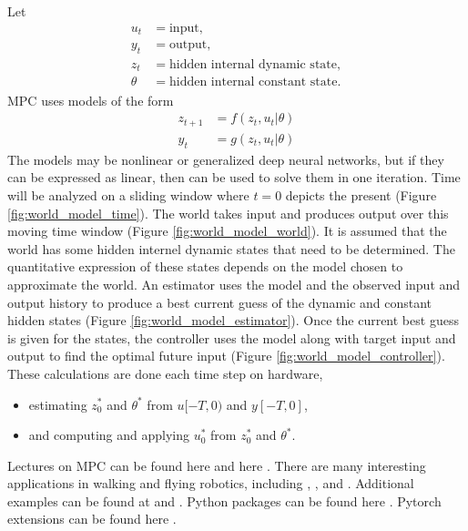 \documentclass{article}
\begin{document}
    Let
    \begin{align*}
        u_t&=\text{input},\\
        y_t&=\text{output},\\
        z_t&=\text{hidden internal dynamic state},\\
        \theta_{\phantom{t}}&=\text{hidden internal constant state}.
    \end{align*}
    MPC uses models of the form 
    \begin{align*}
        z_{t+1}&=f(z_t,u_t|\theta)\\
        y_t &= g(z_t,u_t|\theta)
    \end{align*}
    The models may be nonlinear or generalized deep neural networks, but if they can
    be expressed as linear, then \QP can be used to solve them in one iteration.
    Time will be analyzed on a sliding window where $t=0$ depicts the present 
    (Figure \ref{fig:world_model_time}).
    The world takes input and produces output over this moving time window
    (Figure \ref{fig:world_model_world}).
    It is assumed that the world has some hidden internel dynamic states
    that need to be determined.  
    The quantitative expression of these states depends on the model
    chosen to approximate the world.  An estimator uses the model and the observed
    input and output history to produce a best current guess of the dynamic and constant
    hidden states (Figure \ref{fig:world_model_estimator}).
    Once the current best guess is given for the states,
    the controller uses the model along with target
    input and output to find the optimal future input
    (Figure \ref{fig:world_model_controller}).
    These calculations are done each time step on hardware, 
    \begin{itemize}
        \item estimating $z_0^*$ and $\theta^*$ from $u[-T,0)$ and $y[-T,0]$,
        \item and computing and applying $u_0^*$ from $z_0^*$ and $\theta^*$.
    \end{itemize}

    Lectures on MPC can be found here \cite{mpc} and here \cite{bv_mpc}. 
    There are many interesting applications in walking and flying robotics,
    including \cite{mit}, \cite{eth}, and \cite{dandrea}.  
    Additional examples can be found at \cite{tedrake} and \cite{abbeel}.
    Python packages can be found here \cite{osqp}.
    Pytorch extensions can be found here \cite{mpc_pytorch}.
\end{document}
